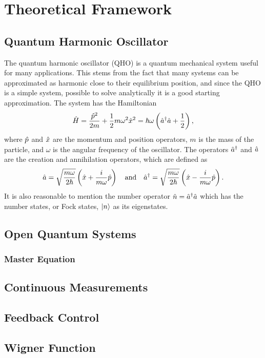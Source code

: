 \section{Theoretical Framework}
\subsection{Quantum Harmonic Oscillator}
The quantum harmonic oscillator (QHO) is a quantum mechanical system useful for many applications. This stems from the fact that many systems can be approximated as harmonic close to their equilibrium position, and since the QHO is a simple system, possible to solve analytically it is a good starting approximation. The system has the Hamiltonian
\begin{equation}
    \hat{H} = \frac{\hat{p}^2}{2m} + \frac{1}{2}m\omega^2\hat{x}^2 = \hbar\omega\left(\hat{a}^{\dagger}\hat{a} + \frac{1}{2}\right),
\end{equation}
where $\hat{p}$ and $\hat{x}$ are the momentum and position operators, $m$ is the mass of the particle, and $\omega$ is the angular frequency of the oscillator. The operators $\hat{a}^{\dagger}$ and $\hat{a}$ are the creation and annihilation operators, which are defined as
\begin{equation}
    \hat{a} = \sqrt{\frac{m\omega}{2\hbar}} \left(\hat{x} + \frac{i}{m\omega} \hat{p}\right) \quad \text{and} \quad \hat{a}^{\dagger} = \sqrt{\frac{m\omega}{2\hbar}} \left(\hat{x} - \frac{i}{m\omega} \hat{p}\right).
\end{equation}
It is also reasonable to mention the number operator $\hat{n} = \hat{a}^{\dagger}\hat{a}$ which has the number states, or Fock states, $\ket{n}$ as its eigenstates.

\subsection{Open Quantum Systems}
\subsubsection{Master Equation}
\subsection{Continuous Measurements}
\subsection{Feedback Control}
\subsection{Wigner Function}